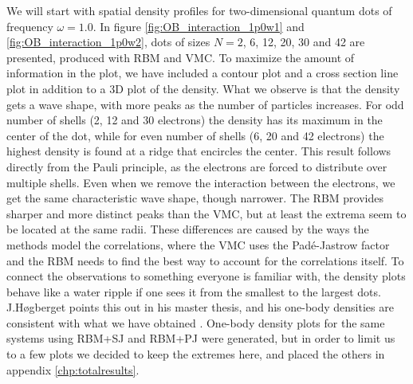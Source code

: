 We will start with spatial density profiles for two-dimensional quantum dots of frequency $\omega=1.0$. In figure \eqref{fig:OB_interaction_1p0w1} and \eqref{fig:OB_interaction_1p0w2}, dots of sizes $N=2$, 6, 12, 20, 30 and 42 are presented, produced with RBM and VMC. To maximize the amount of information in the plot, we have included a contour plot and a cross section line plot in addition to a 3D plot of the density. What we observe is that the density gets a wave shape, with more peaks as the number of particles increases. For odd number of shells (2, 12 and 30 electrons) the density has its maximum in the center of the dot, while for even number of shells (6, 20 and 42 electrons) the highest density is found at a ridge that encircles the center. This result follows directly from the Pauli principle, as the electrons are forced to distribute over multiple shells. Even when we remove the interaction between the electrons, we get the same characteristic wave shape, though narrower. The RBM provides sharper and more distinct peaks than the VMC, but at least the extrema seem to be located at the same radii. These differences are caused by the ways the methods model the correlations, where the VMC uses the Padé-Jastrow factor and the RBM needs to find the best way to account for the correlations itself. To connect the observations to something everyone is familiar with, the density plots behave like a water ripple if one sees it from the smallest to the largest dots. J.Høgberget points this out in his master thesis, and his one-body densities are consistent with what we have obtained \cite{hogberget_quantum_2013}. One-body density plots for the same systems using RBM+SJ and RBM+PJ were generated, but in order to limit us to a few plots we decided to keep the extremes here, and placed the others in appendix \ref{chp:totalresults}.

